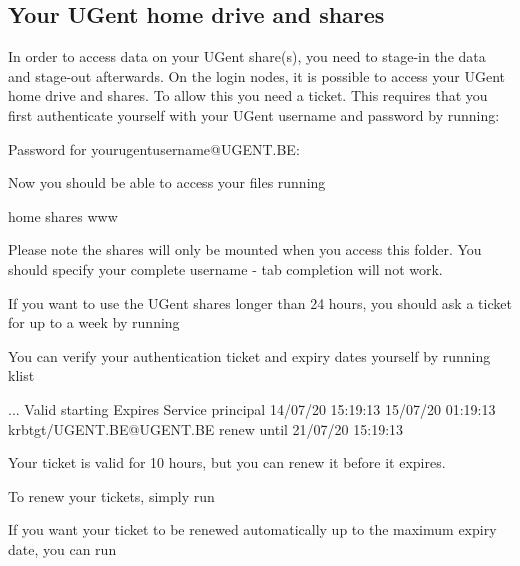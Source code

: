 \ifgent
\subsection{Your UGent home drive and shares \label{subsec:ugent-shares}}

In order to access data on your UGent share(s), you need to stage-in the data and stage-out afterwards.
On the login nodes, it is possible to access your UGent home drive and shares.
To allow this you need a ticket. This requires that you first authenticate yourself with your UGent username and password by running:

\begin{prompt}
Password for yourugentusername@UGENT.BE:
\end{prompt}

Now you should be able to access your files running

\begin{prompt}
home  shares  www
\end{prompt}

Please note the shares will only be mounted when you access this folder.
You should specify your complete username - tab completion will not work.


If you want to use the UGent shares longer than 24 hours,
you should ask a ticket for up to a week by running

\begin{prompt}
\end{prompt}

You can verify your authentication ticket and expiry dates yourself by running klist

\begin{prompt}
...
Valid starting     Expires            Service principal
14/07/20 15:19:13  15/07/20 01:19:13  krbtgt/UGENT.BE@UGENT.BE
	renew until 21/07/20 15:19:13

\end{prompt}

Your ticket is valid for 10 hours, but you can renew it before it expires.

To renew your tickets, simply run

\begin{prompt}
\end{prompt}

If you want your ticket to be renewed automatically up to the maximum expiry date, you can run

